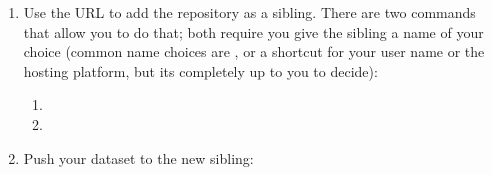 \begin{enumerate}
\item {} 
\sphinxAtStartPar
Use the URL to add the repository as a sibling. There are two commands that allow you to do that; both require you give the sibling a name of your choice (common name choices are , or a short\sphinxhyphen{}cut for your user name or the hosting platform, but its completely up to you to decide):
\begin{enumerate}
%
\item {} 
\sphinxAtStartPar
{}

\item {} 
\sphinxAtStartPar
{}

\end{enumerate}

\item {} 
\sphinxAtStartPar
Push your dataset to the new sibling: 

\end{enumerate}

\begin{center}
\vspace{2cm}
\noindent{}
\end{center}

